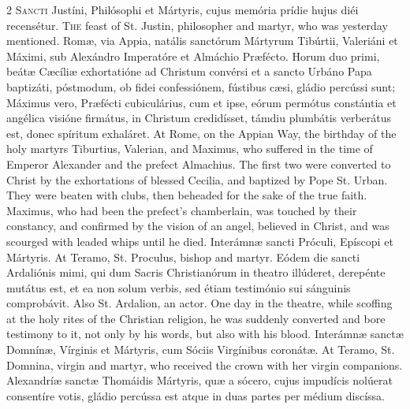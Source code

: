 \begin{paracol}{2}
\lettrine[lines=2]{S}{ancti} Justíni, Philósophi et Mártyris, cujus memória 
 prídie hujus diéi recensétur.
\switchcolumn
{}
\lettrine[lines=2]{T}{he} feast of St. Justin, philosopher and martyr, who was 
 yesterday mentioned.
\switchcolumn*
{}
Romæ, via Appia, 
 natális sanctórum Mártyrum Tibúrtii, Valeriáni et Máximi, sub Alexándro 
 Imperatóre et Almáchio Præfécto. Horum duo primi, beátæ Cæcíliæ 
 exhortatióne ad Christum convérsi et a sancto Urbáno Papa baptizáti, 
 póstmodum, ob fidei confessiónem, fústibus cæsi, gládio percússi sunt; 
 Máximus vero, Præfécti 
 cubiculárius, cum et ipse, eórum permótus constántia 
 et angélica visióne firmátus, in Christum credidísset, támdiu plumbátis 
 verberátus est, donec spíritum exhaláret.
\switchcolumn
{}
At Rome, on the Appian Way, the 
 birthday of the holy martyrs Tiburtius, Valerian, and Maximus, who suffered 
 in the time of Emperor Alexander and the prefect Almachius. The first 
 two were converted to Christ by the exhortations of blessed Cecilia, and 
 baptized by Pope St. Urban. They were beaten with clubs, then beheaded 
 for the sake of the true faith. Maximus, who had been the prefect's 
 chamberlain, was touched by their constancy, and confirmed by the vision of 
 an angel, believed in Christ, and was scourged with leaded whips until he 
 died.
\switchcolumn*
{}
Interámnæ sancti 
 Próculi, Epíscopi et Mártyris.
\switchcolumn
{}
At Teramo, St. Proculus, bishop and 
 martyr.
\switchcolumn*
{}
Eódem die sancti 
 Ardaliónis mimi, qui dum Sacris Christianórum in theatro illúderet, 
 derepénte mutátus est, et ea non solum verbis, sed étiam testimónio sui 
 sánguinis comprobávit.
\switchcolumn
{}
Also St. Ardalion, an actor. 
 One day in the theatre, while scoffing at the holy rites of the Christian 
 religion, he was suddenly converted and bore testimony to it, not only by 
 his words, but also with his blood.
\switchcolumn*
{}
Interámnæ sanctæ 
 Domnínæ, Vírginis et Mártyris, cum Sóciis Virgínibus coronátæ.
\switchcolumn
{}
At Teramo, St. Domnina, virgin and 
 martyr, who received the crown with her virgin companions.
\switchcolumn*
{}
Alexandríæ sanctæ 
 Thomáidis Mártyris, quæ a sócero, cujus impudícis nolúerat consentíre votis, 
 gládio percússa est atque in duas partes per médium discíssa.
\switchcolumn
{}

\end{paracol}
